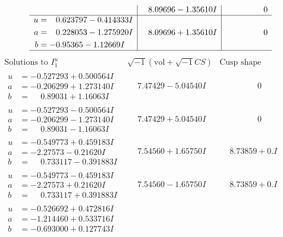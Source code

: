 \documentclass[1p]{elsarticle_modified}
\theoremstyle{definition}
\newcommand{\I}{\sqrt{-1}}
\begin{document}
$$\begin{array}{c|c|c}
 & \phantom{-}8.09696 - 1.35610 I & \phantom{-0.000000 } 0 \\ \hline\begin{aligned}
u &= \phantom{-}0.623797 - 0.414333 I \\
a &= \phantom{-}0.228053 - 1.275920 I \\
b &= -0.95365 - 1.12669 I\end{aligned}
 & \phantom{-}8.09696 + 1.35610 I & \phantom{-0.000000 } 0\\
 \hline 
 \end{array}$$\newpage$$\begin{array}{c|c|c}  
\text{Solutions to }I^u_{1}& \I (\text{vol} + \sqrt{-1}CS) & \text{Cusp shape}\\
 \hline 
\begin{aligned}
u &= -0.527293 + 0.500564 I \\
a &= -0.206299 + 1.273140 I \\
b &= \phantom{-}0.89031 + 1.16063 I\end{aligned}
 & \phantom{-}7.47429 - 5.04540 I & \phantom{-0.000000 } 0 \\ \hline\begin{aligned}
u &= -0.527293 - 0.500564 I \\
a &= -0.206299 - 1.273140 I \\
b &= \phantom{-}0.89031 - 1.16063 I\end{aligned}
 & \phantom{-}7.47429 + 5.04540 I & \phantom{-0.000000 } 0 \\ \hline\begin{aligned}
u &= -0.549773 + 0.459183 I \\
a &= -2.27573 - 0.21620 I \\
b &= \phantom{-}0.733117 - 0.391883 I\end{aligned}
 & \phantom{-}7.54560 + 1.65750 I & \phantom{-}8.73859 + 0. I\phantom{ +0.000000I} \\ \hline\begin{aligned}
u &= -0.549773 - 0.459183 I \\
a &= -2.27573 + 0.21620 I \\
b &= \phantom{-}0.733117 + 0.391883 I\end{aligned}
 & \phantom{-}7.54560 - 1.65750 I & \phantom{-}8.73859 + 0. I\phantom{ +0.000000I} \\ \hline\begin{aligned}
u &= -0.526692 + 0.472816 I \\
a &= -1.214460 + 0.533716 I \\
b &= -0.693000 + 0.127743 I\end{aligned}

\end{array}$$
\end{document}
